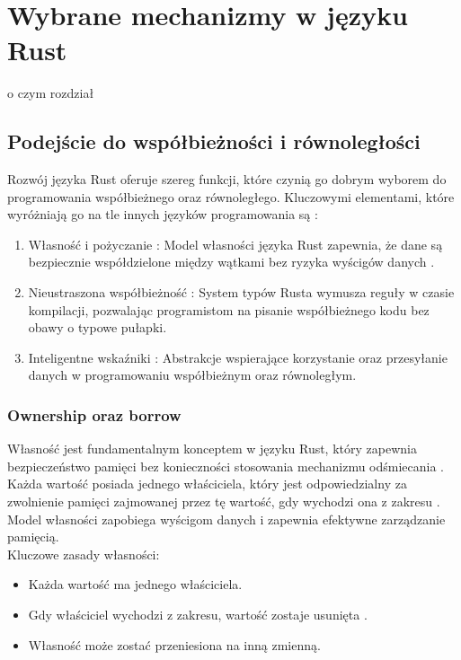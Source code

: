 \chapter{Wybrane mechanizmy w języku Rust}
o czym rozdział
\section{Podejście do współbieżności i równoległości}

Rozwój języka Rust oferuje szereg funkcji, które czynią go dobrym wyborem do programowania współbieżnego oraz równoległego. Kluczowymi elementami, które wyróżniają go na tle innych języków programowania są \cite{rustPolishNames}:
\begin{enumerate}
    \item Własność  i pożyczanie : Model własności języka Rust zapewnia, że dane są bezpiecznie współdzielone między wątkami bez ryzyka wyścigów danych .
    \item Nieustraszona współbieżność : System typów Rusta wymusza reguły w czasie kompilacji, pozwalając programistom na pisanie współbieżnego kodu bez obawy o typowe pułapki.
    \item Inteligentne wskaźniki : Abstrakcje wspierające korzystanie oraz przesyłanie danych w programowaniu współbieżnym oraz równoległym.
\end{enumerate}

\subsection{Ownership oraz borrow}
\label{ownership_borrow}
Własność  jest fundamentalnym konceptem w języku Rust, który zapewnia bezpieczeństwo pamięci bez konieczności stosowania mechanizmu odśmiecania . Każda wartość posiada jednego właściciela, który jest odpowiedzialny za zwolnienie pamięci zajmowanej przez tę wartość, gdy wychodzi ona z zakresu . Model własności zapobiega wyścigom danych i zapewnia efektywne zarządzanie pamięcią.\\
Kluczowe zasady własności:
\begin{itemize}
    \item Każda wartość ma jednego właściciela.
    \item Gdy właściciel wychodzi z zakresu, wartość zostaje usunięta .
    \item Własność może zostać przeniesiona  na inną zmienną.
\end{itemize}

